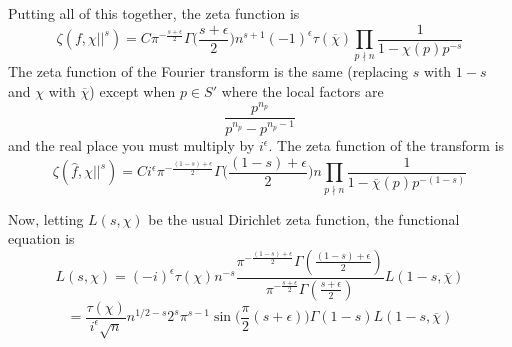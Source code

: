\documentclass[12pt, letterpaper, twoside]
{article}
\newcommand{\ol}{\overline}
\begin{document}
Putting all of this together, the zeta
function is
\[\zeta(f, \chi||^s) = C\pi^{-\frac{s + \epsilon}{2}} \Gamma\bigg( \frac{s +
\epsilon}{2} \bigg)n^{s + 1} (-1)^{\epsilon}\tau(\ol{\chi}) \prod_{p \nmid n}
\frac{1}{1 - \chi(p)p^{-s}}\] The zeta function of the Fourier transform is the
same (replacing $s$ with $1 - s$ and $\chi$ with $\ol{\chi}$) except when $p \in
S'$ where the local factors are
\[\frac{p^{n_p}}{p^{n_p} - p^{n_p - 1}}\] and the real place you must multiply
by $i^\epsilon$. The zeta function of the transform is
\[\zeta(\hat{f}, \chi||^s) = Ci^\epsilon\pi^{-\frac{(1 - s) +
\epsilon}{2}}\Gamma\bigg( \frac{(1 - s) + \epsilon}{2} \bigg)n \prod_{p \nmid n}
\frac{1}{1 - \ol{\chi}(p)p^{-(1 - s)}}\]

Now, letting $L(s, \chi)$ be the usual Dirichlet zeta function, the functional
equation is
\[L(s, \chi) = (-i)^{\epsilon} \tau(\chi) n^{- s} \frac{\pi^{-\frac{(1 - s) +
\epsilon}{2}}\Gamma(\frac{(1 - s) + \epsilon}{2})}{\pi^{-\frac{s + \epsilon}{2}}
\Gamma(\frac{s + \epsilon}{2})} L(1 - s, \ol{\chi})\]
\[= \frac{\tau(\chi)}{i^\epsilon \sqrt{n}}n^{1/2-s}2^s\pi^{s -
1}\sin\bigg(\frac{\pi}{2}(s + \epsilon)\bigg)\Gamma(1 - s)L(1 - s, \ol{\chi})\]
\end{document}
